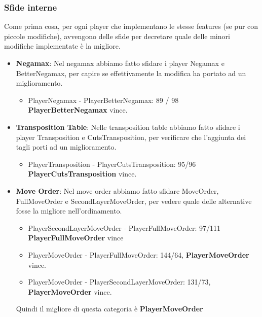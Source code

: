 \documentclass{article}
\begin{document}
\subsubsection{Sfide interne}
Come prima cosa, per ogni player che implementano le stesse features (se pur con piccole modifiche), avvengono delle sfide per decretare quale delle minori modifiche implementate è la migliore.
\begin{itemize}
    \item \textbf{Negamax}: Nel negamax abbiamo fatto sfidare i player Negamax e BetterNegamax, per capire se effettivamente la modifica ha portato ad un miglioramento.
    \begin{itemize}
        \item PlayerNegamax - PlayerBetterNegamax: 89 / 98 \textbf{PlayerBetterNegamax} vince.
    \end{itemize}
    
    
    \item \textbf{Transposition Table}: Nelle transposition table abbiamo fatto sfidare i player Transposition e CutsTransposition, per verificare che l'aggiunta dei tagli porti ad un miglioramento. 
    \begin{itemize}
        \item PlayerTransposition - PlayerCutsTransposition: 95/96 \textbf{PlayerCutsTransposition} vince.
    \end{itemize}
    
    
    \item \textbf{Move Order}: Nel move order abbiamo fatto sfidare MoveOrder, FullMoveOrder e SecondLayerMoveOrder, per vedere quale delle alternative fosse la migliore nell'ordinamento.
        \begin{itemize}
            \item PlayerSecondLayerMoveOrder - PlayerFullMoveOrder: 97/111 \textbf{PlayerFullMoveOrder} vince 
            \item PlayerMoveOrder - PlayerFullMoveOrder: 144/64, \textbf{PlayerMoveOrder} vince.
            \item PlayerMoveOrder - PlayerSecondLayerMoveOrder: 131/73, \textbf{PlayerMoveOrder} vince.
        \end{itemize}
         Quindi il migliore di questa categoria è \textbf{PlayerMoveOrder}
\end{itemize}
\end{document}
